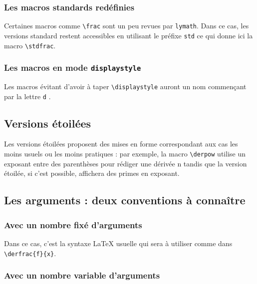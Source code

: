 \documentclass[12pt,a4paper]{article}
\newcommand\env[1]{\texttt{#1}}
\newcommand\macro[1]{\env{\textbackslash{}#1}}
\theoremstyle{definition}
\newcommand\prefix[1]{%
	\texttt{#1}%
}
\begin{document}


\subsubsection{Les macros standards redéfinies}

Certaines macros comme \verb+\frac+ sont un peu revues par \verb+lymath+.
Dans ce cas, les versions standard restent accessibles en utilisant le préfixe \prefix{std} ce qui donne ici la macro \verb+\stdfrac+.




\subsubsection{Les macros en mode \texttt{displaystyle}}

Les macros évitant d'avoir à taper \macro{displaystyle} auront un nom commençant par la lettre \prefix{d}.




\subsection{Versions étoilées}

Les versions étoilées proposent des mises en forme correspondant aux cas les moins usuels ou les moins pratiques : par exemple, la macro \macro{derpow} utilise un exposant entre des parenthèses pour rédiger une dérivée n\ieme{} tandis que la version étoilée, si c'est possible, affichera des primes en exposant.




\subsection{Les arguments : deux conventions à connaître}

\subsubsection{Avec un nombre fixé d'arguments}

Dans ce cas, c'est la syntaxe \LaTeX{} usuelle qui sera à utiliser comme dans \macro{derfrac\{f\}\{x\}}.




\subsubsection{Avec un nombre variable d'arguments}
\end{document}
